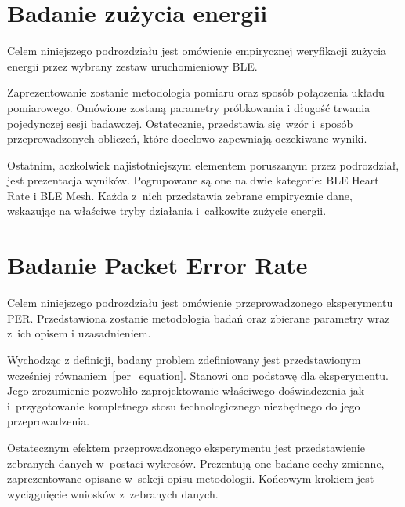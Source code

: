 \section{Badanie zużycia energii}\label{experiment:energy-consumption}
Celem niniejszego podrozdziału jest omówienie empirycznej weryfikacji
zużycia energii przez wybrany zestaw uruchomieniowy \gls{BLE}.

Zaprezentowanie zostanie metodologia pomiaru oraz sposób połączenia
układu pomiarowego. Omówione zostaną parametry próbkowania i długość trwania
pojedynczej sesji badawczej. Ostatecznie, przedstawia się wzór i~sposób
przeprowadzonych obliczeń, które docelowo zapewniają oczekiwane wyniki.

Ostatnim, aczkolwiek najistotniejszym elementem poruszanym przez podrozdział,
jest prezentacja wyników. Pogrupowane są one na dwie kategorie: BLE Heart Rate
i BLE Mesh. Każda z~nich przedstawia zebrane empirycznie dane, wskazując
na właściwe tryby działania i~całkowite zużycie energii.



\section{Badanie Packet Error Rate}\label{experiment:per}

Celem niniejszego podrozdziału jest omówienie przeprowadzonego eksperymentu \gls{PER}. Przedstawiona zostanie
metodologia badań oraz zbierane parametry wraz z~ich opisem i uzasadnieniem.

Wychodząc z definicji, badany problem zdefiniowany jest przedstawionym wcześniej równaniem~\ref{per_equation}.
Stanowi ono podstawę dla eksperymentu. Jego zrozumienie pozwoliło zaprojektowanie właściwego doświadczenia
jak i~przygotowanie kompletnego stosu technologicznego niezbędnego do jego przeprowadzenia.

Ostatecznym efektem przeprowadzonego eksperymentu jest przedstawienie zebranych danych w~postaci
wykresów. Prezentują one badane cechy zmienne, zaprezentowane opisane w~sekcji opisu metodologii. 
Końcowym krokiem jest wyciągnięcie wniosków z~zebranych danych.
 


